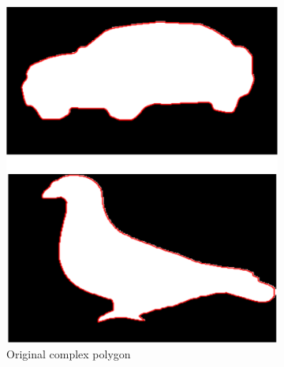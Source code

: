 \documentclass[10pt,twocolumn,letterpaper]{article}
\begin{document}
\begin{figure}
    \centering
    \begin{subfigure}[t]{0.15\textwidth}
        \centering
        \includegraphics[width=\textwidth]{images/shape_truth}
        \caption{Original complex polygon}
    \end{subfigure}
    \hfill
    \begin{subfigure}[t]{0.15\textwidth}
        \centering

\end{subfigure}
\end{figure}
\end{document}
